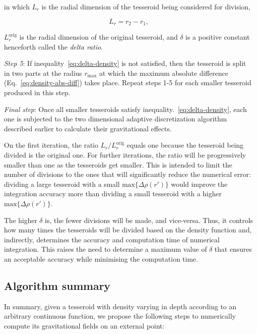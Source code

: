 \documentclass[extra, referee]{gji}
\begin{document}
\noindent
in which $L_r$ is the radial dimension of the tesseroid being considered for division,

\begin{equation}
    L_r = r_2 - r_1,
\end{equation}

\noindent $L_r^\text{orig}$ is the radial dimension of the original tesseroid, and
$\delta$ is a positive constant henceforth called the \textit{delta ratio}.

\textit{Step 5}:
If inequality~\ref{eq:delta-density} is not satisfied, then the tesseroid is split in
two parts at the radius $r_\text{max}$ at which the maximum absolute difference
(Eq.~\ref{eq:density-abs-diff}) takes place.
Repeat steps 1-5 for each smaller tesseroid produced in this step.

\textit{Final step}:
Once all smaller tesseroids satisfy inequality.~\ref{eq:delta-density}, each one is
subjected to the two dimensional adaptive discretization algorithm described earlier to
calculate their gravitational effects.

On the first iteration, the ratio $L_r/L_r^\text{orig}$ equals one because the tesseroid
being divided is the original one.
For further iterations, the ratio will be progressively smaller than one as the
tesseroids get smaller.
This is intended to limit the number of divisions to the ones that will
significantly reduce the numerical error:
dividing a large tesseroid with a small $\text{max}\{ \Delta \rho(r') \}$ would
improve the integration accuracy more than dividing a small tesseroid with a
higher $\text{max}\{ \Delta \rho(r') \}$.

The higher $\delta$ is, the fewer divisions will be made, and vice-versa.
Thus, it controls how many times the tesseroids will be divided based on the density
function and, indirectly, determines the accuracy and computation time of
numerical integration.
This raises the need to determine a maximum value of $\delta$ that
ensures an acceptable accuracy while minimising the computation time.


\subsection{Algorithm summary}

In summary, given a tesseroid with density varying in depth according to an arbitrary
continuous function, we propose the following steps to numerically compute its
gravitational fields on an external point:
\end{document}
